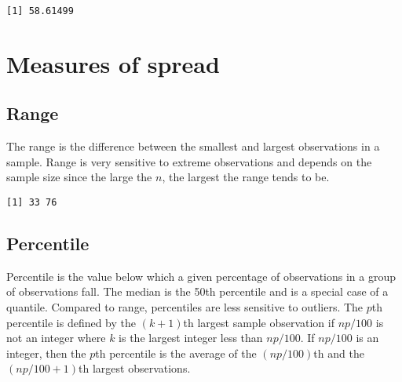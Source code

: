 \documentclass[]{book}
\newenvironment{Shaded}{\begin{snugshade}}{\end{snugshade}}
\newcommand{\KeywordTok}[1]{\textcolor[rgb]{0.13,0.29,0.53}{\textbf{#1}}}
\newcommand{\DataTypeTok}[1]{\textcolor[rgb]{0.13,0.29,0.53}{#1}}
\newcommand{\DecValTok}[1]{\textcolor[rgb]{0.00,0.00,0.81}{#1}}
\newcommand{\FloatTok}[1]{\textcolor[rgb]{0.00,0.00,0.81}{#1}}
\newcommand{\CommentTok}[1]{\textcolor[rgb]{0.56,0.35,0.01}{\textit{#1}}}
\newcommand{\OperatorTok}[1]{\textcolor[rgb]{0.81,0.36,0.00}{\textbf{#1}}}
\newcommand{\NormalTok}[1]{#1}
\theoremstyle{definition}
\theoremstyle{definition}
\theoremstyle{definition}
\theoremstyle{remark}
\begin{document}
\begin{verbatim}
[1] 58.61499
\end{verbatim}

\section{Measures of spread}\label{measures-of-spread}

\subsection{Range}\label{range}

The range is the difference between the smallest and largest
observations in a sample. Range is very sensitive to extreme
observations and depends on the sample size since the large the \({n}\),
the largest the range tends to be.

\begin{Shaded}
\end{Shaded}

\begin{verbatim}
[1] 33 76
\end{verbatim}

\subsection{Percentile}\label{percentile}

Percentile is the value below which a given percentage of observations
in a group of observations fall. The median is the 50th percentile and
is a special case of a quantile. Compared to range, percentiles are less
sensitive to outliers. The \({p}\)th percentile is defined by the
\({(k+1)}\)th largest sample observation if \({np/100}\) is not an
integer where \({k}\) is the largest integer less than \({np/100}\). If
\({np/100}\) is an integer, then the \({p}\)th percentile is the average
of the \({(np/100)}\)th and the \({(np/100+1)}\)th largest observations.

\begin{Shaded}
\end{Shaded}
\end{document}
